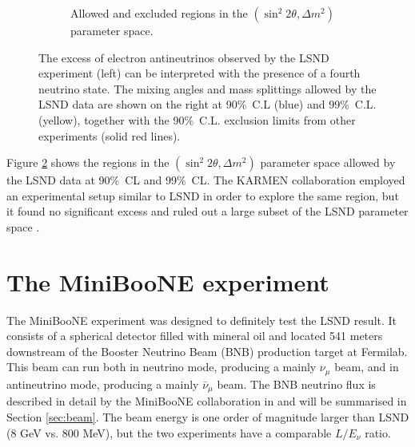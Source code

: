 \begin{figure}[htbp]
\begin{subfigure}{0.45\textwidth}
\begin{center}
        \caption{Allowed and excluded regions in the $(\sin^2 2\theta, \Delta m^2)$ parameter space.}\label{fig:lsnd_space}
    \end{center}
  \end{subfigure}
    \caption{The excess of electron antineutrinos observed by the LSND experiment (left) can be interpreted with the presence of a fourth neutrino state. The mixing angles and mass splittings allowed by the LSND data are shown on the right at 90\%~C.L (blue) and 99\%~C.L. (yellow), together with the 90\%~C.L. exclusion limits from other experiments (solid red lines).}
\end{figure}

Figure \ref{fig:lsnd_space} shows the regions in the $(\sin^2 2\theta, \Delta m^2)$ parameter space allowed by the LSND data at 90\%~CL and 99\%~CL. %
The KARMEN collaboration employed an experimental setup similar to LSND in order to explore the same region, but it found no significant excess and ruled out a large subset of the LSND parameter space \cite{Eitel:2000by}. 

\section{The MiniBooNE experiment}\label{sec:miniboone}
The MiniBooNE experiment was designed to definitely test the LSND result. It consists of a spherical detector filled with mineral oil and located 541 meters downstream of the Booster Neutrino Beam (BNB) production target at Fermilab. This beam can run both in neutrino mode, producing a mainly $\nu_{\mu}$ beam, and in antineutrino mode, producing a mainly $\bar{\nu}_{\mu}$ beam. The BNB neutrino flux is described in detail by the MiniBooNE collaboration in \cite{AguilarArevalo:2008yp} and will be summarised in Section \ref{sec:beam}. The beam energy is one order of magnitude larger than LSND (8 GeV vs. 800 MeV), but the two experiments have a comparable $L/E_{\nu}$ ratio.

